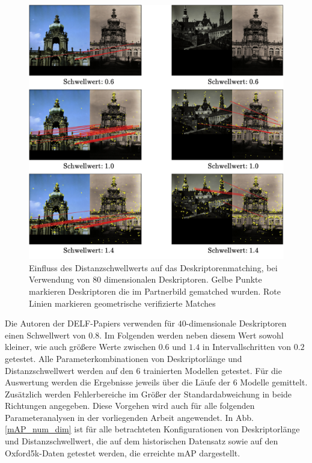 \begin{figure}[H]
\centering
\includegraphics[scale=0.86]{influence_threshold}
\caption{Einfluss des Distanzschwellwerts auf das Deskriptorenmatching, bei Verwendung von $80$ dimensionalen Deskriptoren. Gelbe Punkte markieren Deskriptoren die im Partnerbild gematched wurden. Rote Linien markieren geometrische verifizierte Matches}
\label{influence_threshold}
\end{figure}

Die Autoren der DELF-Papiers \cite{delf} verwenden für $40$-dimensionale Deskriptoren einen Schwellwert von $0.8$. 
Im Folgenden werden neben diesem Wert sowohl kleiner, wie auch größere Werte zwischen $0.6$ und $1.4$ in Intervallschritten von $0.2$ getestet. Alle Parameterkombinationen von Deskriptorlänge und Distanzschwellwert werden auf den $6$ trainierten Modellen getestet. Für die Auswertung werden die Ergebnisse jeweils über die Läufe der $6$ Modelle gemittelt. Zusätzlich werden Fehlerbereiche im Größer der Standardabweichung in beide Richtungen angegeben. Diese Vorgehen wird auch für alle folgenden Parameteranalysen in der vorliegenden Arbeit angewendet. In Abb. \ref{mAP_num_dim} ist für alle betrachteten Konfigurationen von Deskriptorlänge und Distanzschwellwert, die auf dem historischen Datensatz sowie auf den Oxford5k-Daten getestet werden, die erreichte mAP dargestellt.

